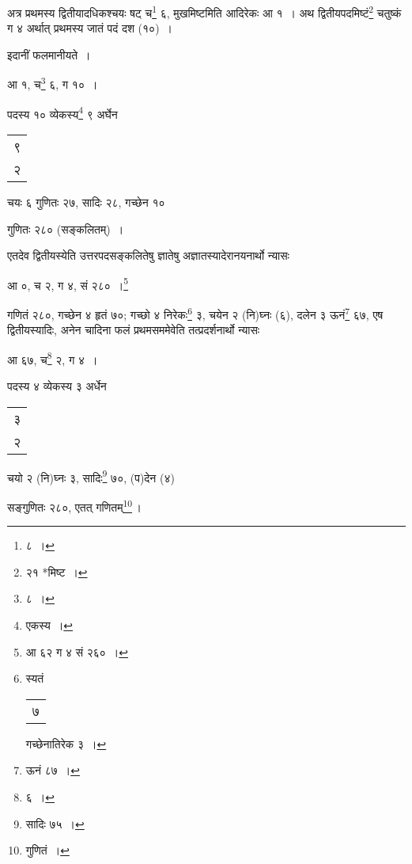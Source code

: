 \documentclass[10pt, openany]{book}
\begin{document}
{{{{{{{{{{{{{{{अत्र प्रथमस्य द्वितीयादधिकश्चयः षट् च\renewcommand{\thefootnote}{४}\footnote{८~।} ६, मुखमिष्टमिति आदिरेकः आ १~। अथ}
{द्वितीयपदमिष्टं\renewcommand{\thefootnote}{५}\footnote{२१ *मिष्ट~।}  चतुष्कं ग ४ अर्थात् प्रथमस्य जातं पदं दश (१०)~।}
\vspace{3mm}

{इदानीं फलमानीयते~।}
\vspace{2mm}

\hspace{15mm} {आ १, च\renewcommand{\thefootnote}{६}\footnote{८~।} ६, ग १०~।}
\vspace{3mm}

{पदस्य १० व्येकस्य\renewcommand{\thefootnote}{७}\footnote{एकस्य~।}  ९ अर्घेन \begin{tabular}{|c|}९ \\२\\\hline \end{tabular}  चयः ६
गुणितः २७, सादिः २८, गच्छेन १०}
{गुणितः २८० (सङ्कलितम्)~।}
\vspace{3mm}

{एतदेव द्वितीयस्येति उत्तरपदसङ्कलितेषु ज्ञातेषु अज्ञातस्यादेरानयनार्थो
न्यासः\textemdash}
\vspace{2mm}

\hspace{15mm}  आ ०, च २, ग ४, सं २८०~।\renewcommand{\thefootnote}{८}\footnote{आ ६२ ग ४ सं २६०~।}
\vspace{3mm}

{गणितं २८०, गच्छेन ४ हृतं ७०; गच्छो ४ निरेकः\renewcommand{\thefootnote}{९}\footnote{स्यतं \begin{tabular}{c|}\hline ७\end{tabular}  गच्छेनातिरेक ३~।} ३, चयेन २ (नि)घ्नः
(६), दलेन}
{३ ऊनं\renewcommand{\thefootnote}{१०}\footnote{ऊनं ८७~।} ६७, एष द्वितीयस्यादिः, अनेन चादिना फलं प्रथमसममेवेति
तत्प्रदर्शनार्थो न्यासः\textemdash}
\vspace{2mm}

\hspace{15mm} {आ ६७, च\renewcommand{\thefootnote}{११}\footnote{६~।} २, ग ४~।}

\vspace{3mm}
{पदस्य ४ व्येकस्य ३ अर्धेन \begin{tabular}{|c|} ३\\ २\\\hline \end{tabular} चयो २
(नि)घ्नः ३, सादिः\renewcommand{\thefootnote}{१२}\footnote{सादिः ७५~।} ७०, (प)देन (४)}
{सङ्गुणितः २८०, एतत् गणितम्\renewcommand{\thefootnote}{१३}\footnote{गुणितं~।}\,।}
\vspace{3mm}

}}}}}}}}}}}}}}
\end{document}
